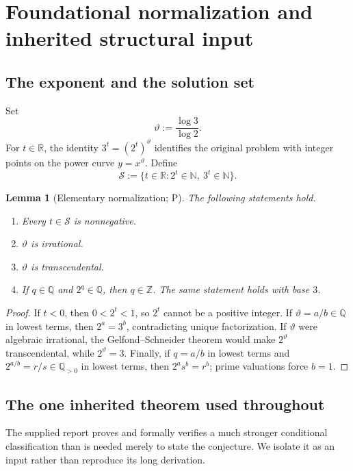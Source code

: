 \documentclass[10pt,oneside]{article}
\newtheorem{lemma}[theorem]{Lemma}
\theoremstyle{definition}
\theoremstyle{remark}
\newcommand{\N}{\mathbb N}
\newcommand{\Z}{\mathbb Z}
\newcommand{\Q}{\mathbb Q}
\newcommand{\R}{\mathbb R}
\newcommand{\Sol}{\mathcal S}
\newcommand{\thetaq}{\vartheta}
\newcommand{\statusP}{\textsc{P}}
\begin{document}
\section{Foundational normalization and inherited structural input}
\label{sec:foundations}

\subsection{The exponent and the solution set}
Set
\[
 \thetaq:=\frac{\log 3}{\log 2}.
\]
For \(t\in\R\), the identity \(3^t=(2^t)^{\thetaq}\) identifies the original problem with integer points on the power curve \(y=x^{\thetaq}\).  Define
\[
 \Sol:=\{t\in\R:2^t\in\N,\ 3^t\in\N\}.
\]

\begin{lemma}[Elementary normalization; \statusP]
\label{lem:basic-theta}
The following statements hold.
\begin{enumerate}[label=\textup{(\roman*)}]
\item Every \(t\in\Sol\) is nonnegative.
\item \(\thetaq\) is irrational.
\item \(\thetaq\) is transcendental.
\item If \(q\in\Q\) and \(2^q\in\Q\), then \(q\in\Z\).  The same statement holds with base \(3\).
\end{enumerate}
\end{lemma}

\begin{proof}
If \(t<0\), then \(0<2^t<1\), so \(2^t\) cannot be a positive integer.  If \(\thetaq=a/b\in\Q\) in lowest terms, then \(2^a=3^b\), contradicting unique factorization.  If \(\thetaq\) were algebraic irrational, the Gelfond--Schneider theorem would make \(2^{\thetaq}\) transcendental, while \(2^{\thetaq}=3\).  Finally, if \(q=a/b\) in lowest terms and \(2^{a/b}=r/s\in\Q_{>0}\) in lowest terms, then \(2^a s^b=r^b\); prime valuations force \(b=1\).
\end{proof}

\subsection{The one inherited theorem used throughout}
The supplied report proves and formally verifies a much stronger conditional classification than is needed merely to state the conjecture.  We isolate it as an input rather than reproduce its long derivation.
\end{document}
